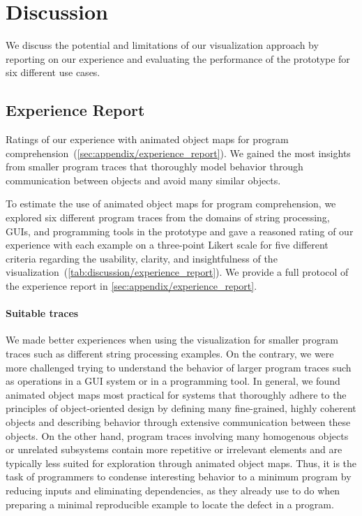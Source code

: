 \section{Discussion}
\label{sec:discussion}

We discuss the potential and limitations of our visualization approach by reporting on our experience and evaluating the performance of the \tfd{} prototype for six different use cases.

\subsection{Experience Report}
\label{sec:discussion/experience_report}

\begin{table}
	\centering
	\caption{
		Ratings of our experience with animated object maps for program comprehension~(\cref{sec:appendix/experience_report}).
		We gained the most insights from smaller program traces that thoroughly model behavior through communication between objects and avoid many similar objects.
	}
	\label{tab:discussion/experience_report}
	\begin{threeparttable}
		\centering
		{\footnotesize
		}
	\end{threeparttable}
\end{table}

To estimate the use of animated object maps for program comprehension, we explored six different program traces from the domains of string processing, GUIs, and programming tools in the \tfd{} prototype and gave a reasoned rating of our experience with each example on a three-point Likert scale for five different criteria regarding the usability, clarity, and insightfulness of the visualization~(\cref{tab:discussion/experience_report}).
We provide a full protocol of the experience report in \cref{sec:appendix/experience_report}.

\paragraph{Suitable traces}

We made better experiences when using the visualization for smaller program traces such as different string processing examples.
On the contrary, we were more challenged trying to understand the behavior of larger program traces such as operations in a GUI system or in a programming tool.
In general, we found animated object maps most practical for systems that thoroughly adhere to the principles of object-oriented design by defining many fine-grained, highly coherent objects and describing behavior through extensive communication between these objects.
On the other hand, program traces involving many homogenous objects or unrelated subsystems contain more repetitive or irrelevant elements and are typically less suited for exploration through animated object maps.
Thus, it is the task of programmers to condense interesting behavior to a minimum program by reducing inputs and eliminating dependencies, as they already use to do when preparing a minimal reproducible example to locate the defect in a program.


